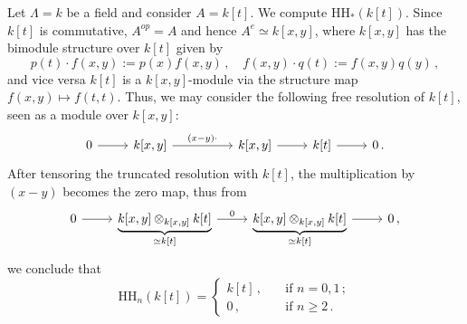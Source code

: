 	\begin{ex}
		Let $\Lambda=k$ be a field and consider $A=k[t]$. We compute $\mathrm{HH}_{*}(k[t])$.
		Since $k[t]$ is commutative, $A^{op} = A$ and hence $A^{e} \simeq k[x,y]$,
		where $k[x,y]$ has the bimodule structure over $k[t]$  given by
		\begin{equation*}
			p(t) \cdot f(x,y) := p(x)f(x,y)\,, \quad f(x,y) \cdot q(t) := f(x,y)q(y) \,,
		\end{equation*}
		and vice versa $k[t]$ is a $k[x,y]$-module via the structure map $f(x,y) \mapsto f(t,t)$.
		Thus, we may consider the following free resolution of $k[t]$, 
		seen as a module over $k[x,y]$:
		\begin{equation*}
			\begin{tikzcd}
				0 \ar[r]
				& k[x,y] \ar[rr, "(x-y)\cdot"]
				& & k[x,y] \ar[r]
				& k[t] \ar[r]
				& 0\,.
			\end{tikzcd}
		\end{equation*}
		After tensoring the truncated resolution with $k[t]$, 
		the multiplication by $(x-y)$ becomes the zero map, 
		thus from
		\begin{equation*}
			\begin{tikzcd}
				0 \ar[r]
				& \underbrace{k{[x,y]} \otimes_{k[x,y]} k[t]}_{\simeq k[t]} \ar[r, "0"]
				& \underbrace{k{[x,y]} \otimes_{k[x,y]} k[t]}_{\simeq k[t]} \ar[r] & 0\,,
			\end{tikzcd}
		\end{equation*}
		we conclude that
		\begin{equation*}
			\mathrm{HH}_{n}(k[t]) =
			\begin{cases}
				k[t]\,, \quad &\text{if } n = 0,1\,; \\
				0\,, \quad &\text{if } n \ge 2\,.
			\end{cases}
		\end{equation*}
	\end{ex}
	
